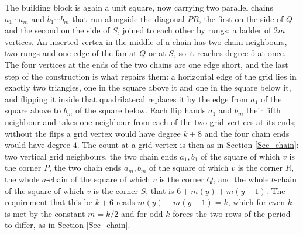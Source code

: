 \documentclass[10pt,a4paper]{article}
\begin{document}
The building block is again a unit square, now carrying two parallel chains
$a_{1}\cdots a_{m}$ and $b_{1}\cdots b_{m}$ that run alongside the diagonal $PR$, the first on the
side of $Q$ and the second on the side of $S$, joined to each other by rungs: a ladder of $2m$
vertices. An inserted vertex in the middle of a chain has two chain neighbours, two rungs and one
edge of the fan at $Q$ or at $S$, so it reaches degree $5$ at once. The four vertices at the ends of
the two chains are one edge short, and the last step of the construction is what repairs them: a
horizontal edge of the grid lies in exactly two triangles, one in the square above it and one in the
square below it, and flipping it inside that quadrilateral replaces it by the edge from $a_{1}$ of the
square above to $b_{m}$ of the square below. Each flip hands $a_{1}$ and $b_{m}$ their fifth
neighbour and takes one neighbour from each of the two grid vertices at its ends; without the flips a
grid vertex would have degree $k+8$ and the four chain ends would have degree $4$. The count at a
grid vertex is then as in Section \ref{Sec_chain}: two vertical grid neighbours, the two chain ends
$a_{1},b_{1}$ of the square of which $v$ is the corner $P$, the two chain ends $a_{m},b_{m}$ of the
square of which $v$ is the corner $R$, the whole $a$-chain of the square of which $v$ is the corner
$Q$, and the whole $b$-chain of the square of which $v$ is the corner $S$, that is
$6+m(y)+m(y-1)$. The requirement that this be $k+6$ reads $m(y)+m(y-1)=k$, which for even $k$ is met
by the constant $m=k/2$ and for odd $k$ forces the two rows of the period to differ, as in Section
\ref{Sec_chain}.
\end{document}
